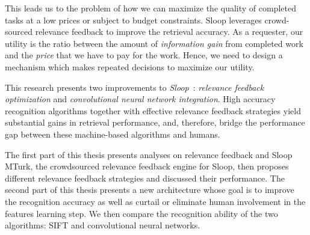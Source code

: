 This leads us to the problem of how we can maximize the quality of completed
tasks at a low prices or subject to budget constraints. Sloop leverages
crowd-sourced relevance feedback to improve the retrieval accuracy. As a
requester, our utility is the ratio between the amount of \emph{information
gain} from completed work and the \emph{price} that we have to pay for the
work. Hence, we need to design a mechanism which makes repeated decisions to
maximize our utility.

This research presents two improvements to \emph{Sloop}~\cite{sloop15}:
\emph{relevance feedback optimization} and \emph{convolutional neural network
integration}. High accuracy recognition algorithms together with effective
relevance feedback strategies yield substantial gains in retrieval performance,
and, therefore, bridge the performance gap between these machine-based
algorithms and humans. 

The first part of this thesis presents analyses on relevance feedback and Sloop
MTurk, the crowdsourced relevance feedback engine for Sloop, then proposes
different relevance feedback strategies and discussed their performance. The
second part of this thesis presents a new architecture whose goal is to improve
the recognition accuracy as well as curtail or eliminate human involvement in
the features learning step. We then compare the recognition ability of the two
algorithms: SIFT and convolutional neural networks.
